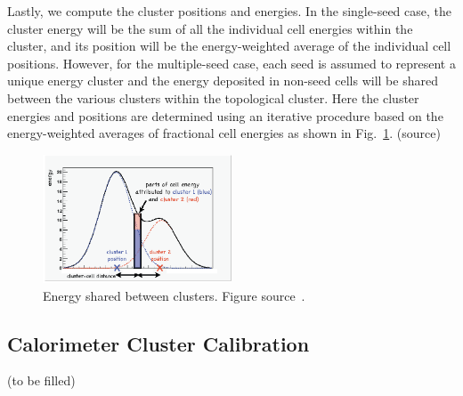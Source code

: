 Lastly, we compute the cluster positions and energies.
In the single-seed case, the cluster energy will be the sum of all the individual cell energies within the cluster, and its position will be the energy-weighted average of the individual cell positions.
However, for the multiple-seed case, each seed is assumed to represent a unique energy cluster and the energy deposited in non-seed cells will be shared between the various clusters within the topological cluster.
Here the cluster energies and positions are determined using an iterative procedure based on the energy-weighted averages of fractional cell energies as shown in Fig.~\ref{fig:clustering}. (source)

\begin{figure}[t!]
\centering
\includegraphics[width=0.50\textwidth]{figures/energy_sharing.png}
\caption[Energy shared between clusters]{Energy shared between clusters. Figure source~\cite{}.}
\label{fig:clustering}
\end{figure}

\subsection{Calorimeter Cluster Calibration}

(to be filled)
